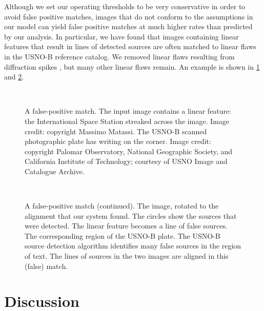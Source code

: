 Although we set our operating thresholds to be very conservative in
order to avoid false positive matches, images that do not conform to
the assumptions in our model can yield false positive matches at much
higher rates than predicted by our analysis.  In particular, we have
found that images containing linear features that result in lines of
detected sources are often matched to linear flaws in the USNO-B
reference catalog.  We removed linear flaws resulting from diffraction
spikes \cite{barroncleaning}, but many other linear flaws remain.  An
example is shown in \figs \ref{fig:falseposA} and \ref{fig:falseposB}.


\begin{figure}[htp]
\begin{center}
\setlength{\fboxsep}{0.5pt}
\setlength{\fboxrule}{0.25pt}
%
\\
%
\end{center}
\caption{A false-positive match.   The input image
contains a linear feature: the International Space Station streaked
across the image.  Image credit: copyright Massimo Matassi.
 The USNO-B scanned photographic plate has
writing on the corner.  Image credit: copyright Palomar Observatory,
National Geographic Society, and California Institute of Technology;
courtesy of USNO Image and Catalogue Archive.
\label{fig:falseposA}}
\end{figure}

\begin{figure}[htp]
\begin{center}
\setlength{\fboxsep}{0.5pt}
\setlength{\fboxrule}{0.25pt}
%
\\
\end{center}
\caption{A false-positive match (continued).   The
image, rotated to the alignment that our system found.  The circles
show the sources that were detected.  The linear feature becomes a
line of false sources.   The corresponding region
of the USNO-B plate.  The USNO-B source detection algorithm identifies
many false sources in the region of text.  The lines of sources in the
two images are aligned in this (false) match.
\label{fig:falseposB}}
\end{figure}

\section{Discussion}

